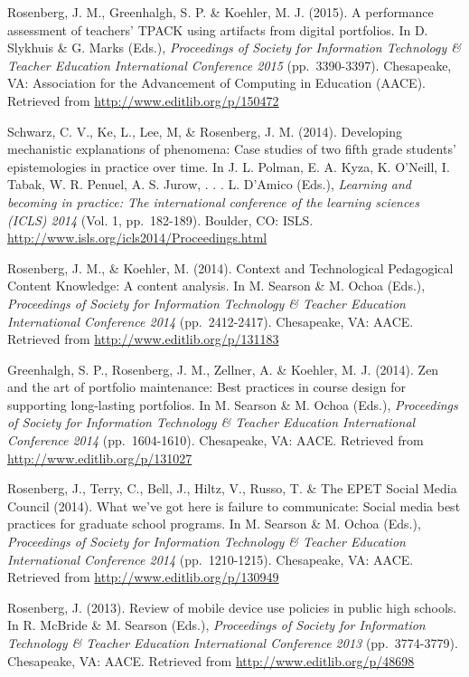 \documentclass[]{article}
\begin{document}
Rosenberg, J. M., Greenhalgh, S. P. \& Koehler, M. J. (2015). A
performance assessment of teachers' TPACK using artifacts from digital
portfolios. In D. Slykhuis \& G. Marks (Eds.), \emph{Proceedings of
Society for Information Technology \& Teacher Education International
Conference 2015} (pp.~3390-3397). Chesapeake, VA: Association for the
Advancement of Computing in Education (AACE). Retrieved from
\url{http://www.editlib.org/p/150472}

Schwarz, C. V., Ke, L., Lee, M, \& Rosenberg, J. M. (2014). Developing
mechanistic explanations of phenomena: Case studies of two fifth grade
students' epistemologies in practice over time. In J. L. Polman, E. A.
Kyza, K. O'Neill, I. Tabak, W. R. Penuel, A. S. Jurow, . . . L. D'Amico
(Eds.), \emph{Learning and becoming in practice: The international
conference of the learning sciences (ICLS) 2014} (Vol. 1, pp.~182-189).
Boulder, CO: ISLS. \url{http://www.isls.org/icls2014/Proceedings.html}

Rosenberg, J. M., \& Koehler, M. (2014). Context and Technological
Pedagogical Content Knowledge: A content analysis. In M. Searson \& M.
Ochoa (Eds.), \emph{Proceedings of Society for Information Technology \&
Teacher Education International Conference 2014} (pp.~2412-2417).
Chesapeake, VA: AACE. Retrieved from
\url{http://www.editlib.org/p/131183}

Greenhalgh, S. P., Rosenberg, J. M., Zellner, A. \& Koehler, M. J.
(2014). Zen and the art of portfolio maintenance: Best practices in
course design for supporting long-lasting portfolios. In M. Searson \&
M. Ochoa (Eds.), \emph{Proceedings of Society for Information Technology
\& Teacher Education International Conference 2014} (pp.~1604-1610).
Chesapeake, VA: AACE. Retrieved from
\url{http://www.editlib.org/p/131027}

Rosenberg, J., Terry, C., Bell, J., Hiltz, V., Russo, T. \& The EPET
Social Media Council (2014). What we've got here is failure to
communicate: Social media best practices for graduate school programs.
In M. Searson \& M. Ochoa (Eds.), \emph{Proceedings of Society for
Information Technology \& Teacher Education International Conference
2014} (pp.~1210-1215). Chesapeake, VA: AACE. Retrieved from
\url{http://www.editlib.org/p/130949}

Rosenberg, J. (2013). Review of mobile device use policies in public
high schools. In R. McBride \& M. Searson (Eds.), \emph{Proceedings of
Society for Information Technology \& Teacher Education International
Conference 2013} (pp.~3774-3779). Chesapeake, VA: AACE. Retrieved from
\url{http://www.editlib.org/p/48698}
\end{document}
